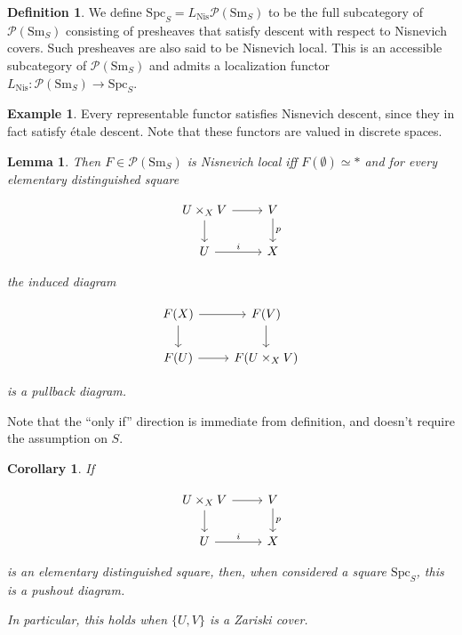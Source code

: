 \documentclass{shortart}
\newtheorem{lemma}[thm]{Lemma}
\newtheorem{cor}[thm]{Corollary}
\theoremstyle{definition}
\newtheorem{defi}[thm]{Definition}
\newtheorem{eg}[thm]{Example}
\newcommand\Sm{\mathrm{Sm}}
\newcommand\Spc{\mathrm{Spc}}
\newcommand\Nis{\mathrm{Nis}}
\newcommand\Pre{\mathcal{P}}
\begin{document}
\begin{defi}
  We define $\Spc_S = L_{\Nis}\Pre(\Sm_S)$ to be the full subcategory of $\Pre(\Sm_S)$ consisting of presheaves that satisfy descent with respect to Nisnevich covers. Such presheaves are also said to be Nisnevich local. This is an accessible subcategory of $\Pre(\Sm_S)$ and admits a localization functor $L_{\Nis} : \Pre(\Sm_S) \to \Spc_S$.
\end{defi}

\begin{eg}
  Every representable functor satisfies Nisnevich descent, since they in fact satisfy \'etale descent. Note that these functors are valued in discrete spaces.
\end{eg}

\begin{lemma}
  Then $F \in \Pre(\Sm_S)$ is Nisnevich local iff $F(\emptyset) \simeq *$ and for every elementary distinguished square
  \begin{useimager}
    \[
      \begin{tikzcd}
        U \times_X V \ar[r] \ar[d] & V \ar[d, "p"]\\
        U \ar[r, "i"] & X
      \end{tikzcd}
    \]
  \end{useimager}
  the induced diagram
  \begin{useimager}
    \[
      \begin{tikzcd}
        F(X) \ar[r] \ar[d] & F(V) \ar[d]\\
        F(U) \ar[r] & F(U \times_X V)
      \end{tikzcd}
    \]
  \end{useimager}
  is a pullback diagram.
\end{lemma}
Note that the ``only if'' direction is immediate from definition, and doesn't require the assumption on $S$.

\begin{cor}
  If 
  \begin{useimager}
    \[
      \begin{tikzcd}
        U \times_X V \ar[r] \ar[d] & V \ar[d, "p"]\\
        U \ar[r, "i"] & X
      \end{tikzcd}
    \]
  \end{useimager}
  is an elementary distinguished square, then, when considered a square $\Spc_S$, this is a pushout diagram.

  In particular, this holds when $\{U, V\}$ is a Zariski cover.
\end{cor}
\end{document}

